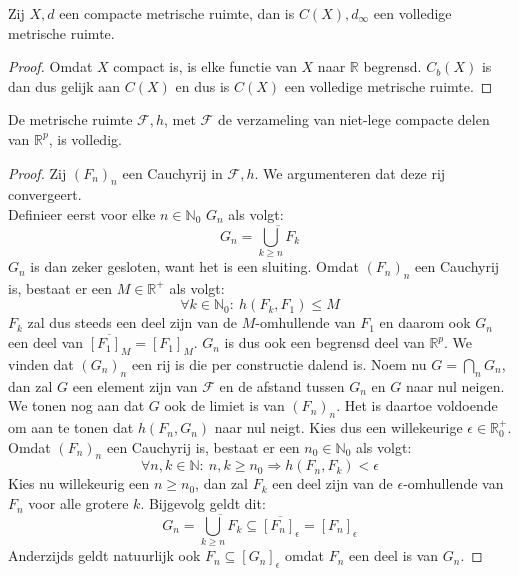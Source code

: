 \documentclass[main.tex]{subfiles}
\begin{document}
\begin{gev}
  Zij $X,d$ een compacte metrische ruimte, dan is $C(X),d_{\infty}$ een volledige metrische ruimte.

  \begin{proof}
    Omdat $X$ compact is, is elke functie van $X$ naar $\mathbb{R}$ begrensd.
    $C_{b}(X)$ is dan dus gelijk aan $C(X)$ en dus is $C(X)$ een volledige metrische ruimte.
  \end{proof}
\end{gev}


\begin{bpr}
  De metrische ruimte $\mathcal{F},h$, met $\mathcal{F}$ de verzameling van niet-lege compacte delen van $\mathbb{R}^{p}$, is volledig.

  \begin{proof}
    Zij $(F_{n})_{n}$ een Cauchyrij in $\mathcal{F},h$.
    We argumenteren dat deze rij convergeert.\\
    Definieer eerst voor elke $n\in\mathbb{N}_{0}$ $G_{n}$ als volgt:
    \[ G_{n} = \overline{\bigcup_{k \ge n}F_{k}} \]
    $G_{n}$ is dan zeker gesloten, want het is een sluiting.
    Omdat $(F_{n})_{n}$ een Cauchyrij is, bestaat er een $M\in\mathbb{R}^{+}$ als volgt:
    \[ \forall k\in \mathbb{N}_{0}:\ h(F_{k},F_{1}) \le M \]
    $F_{k}$ zal dus steeds een deel zijn van de $M$-omhullende van $F_{1}$ en daarom ook $G_{n}$ een deel van $\overline{[F_{1}]_{M}} = [F_{1}]_{M}$.
    $G_{n}$ is dus ook een begrensd deel van $\mathbb{R}^{p}$.
    We vinden dat $(G_{n})_{n}$ een rij is die per constructie dalend is.
    Noem nu $G = \bigcap_{n} G_{n}$, dan zal $G$ een element zijn van $\mathcal{F}$ en de afstand tussen $G_{n}$ en $G$ naar nul neigen.
    We tonen nog aan dat $G$ ook de limiet is van $(F_{n})_{n}$.
    Het is daartoe voldoende om aan te tonen dat $h(F_{n},G_{n})$ naar nul neigt.
    Kies dus een willekeurige $\epsilon \in \mathbb{R}_{0}^{+}$.
    Omdat $(F_{n})_{n}$ een Cauchyrij is, bestaat er een $n_{0}\in\mathbb{N}_{0}$ als volgt:
    \[ \forall n,k \in\mathbb{N}:\ n,k \ge n_{0}\Rightarrow h(F_{n},F_{k}) < \epsilon \]
    Kies nu willekeurig een $n\ge n_{0}$, dan zal $F_{k}$ een deel zijn van de $\epsilon$-omhullende van $F_{n}$ voor alle grotere $k$.
    Bijgevolg geldt dit:
    \[ G_{n} = \overline{\bigcup_{k \ge n}F_{k}} \subseteq \overline{[F_{n}]_{\epsilon}} = [F_{n}]_{\epsilon} \]
    Anderzijds geldt natuurlijk ook $F_{n} \subseteq [G_{n}]_{\epsilon}$ omdat $F_{n}$ een deel is van $G_{n}$.
  \end{proof}
\end{bpr}
\end{document}
